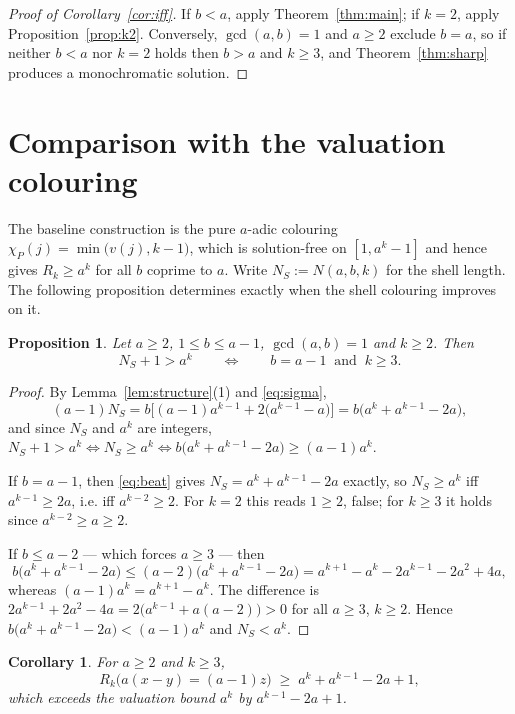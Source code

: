 \documentclass{amsart}
\newtheorem{proposition}[theorem]{Proposition}
\newtheorem{corollary}[theorem]{Corollary}
\theoremstyle{definition}
\newcommand{\Rk}{R_k}
\begin{document}
\begin{proof}[Proof of Corollary~\ref{cor:iff}]
If $b<a$, apply Theorem~\ref{thm:main}; if $k=2$, apply
Proposition~\ref{prop:k2}.  Conversely, $\gcd(a,b)=1$ and $a\ge2$ exclude
$b=a$, so if neither $b<a$ nor $k=2$ holds then $b>a$ and $k\ge3$, and
Theorem~\ref{thm:sharp} produces a monochromatic solution.
\end{proof}

\section{Comparison with the valuation colouring}

The baseline construction is the pure $a$-adic colouring
$\chi_P(j)=\min\bigl(v(j),k-1\bigr)$, which is solution-free on $[1,a^{k}-1]$
and hence gives $\Rk\ge a^{k}$ for all $b$ coprime to $a$.  Write
$N_S:=N(a,b,k)$ for the shell length.  The following proposition determines
exactly when the shell colouring improves on it.

\begin{proposition}\label{prop:beat}
Let $a\ge2$, $1\le b\le a-1$, $\gcd(a,b)=1$ and $k\ge2$.  Then
\[
  N_S+1>a^{k}\qquad\Longleftrightarrow\qquad b=a-1\ \text{ and }\ k\ge3 .
\]
\end{proposition}

\begin{proof}
By Lemma~\ref{lem:structure}(1) and \eqref{eq:sigma},
\begin{equation}\label{eq:beat}
  (a-1)N_S=b\bigl[(a-1)a^{k-1}+2\bigl(a^{k-1}-a\bigr)\bigr]
          =b\bigl(a^{k}+a^{k-1}-2a\bigr),
\end{equation}
and since $N_S$ and $a^k$ are integers,
$N_S+1>a^{k}\iff N_S\ge a^{k}\iff b\bigl(a^{k}+a^{k-1}-2a\bigr)\ge(a-1)a^{k}$.

If $b=a-1$, then \eqref{eq:beat} gives $N_S=a^{k}+a^{k-1}-2a$ exactly, so
$N_S\ge a^{k}$ iff $a^{k-1}\ge2a$, i.e. iff $a^{k-2}\ge2$.  For $k=2$ this
reads $1\ge2$, false; for $k\ge3$ it holds since $a^{k-2}\ge a\ge2$.

If $b\le a-2$ --- which forces $a\ge3$ --- then
\[
  b\bigl(a^{k}+a^{k-1}-2a\bigr)\le(a-2)\bigl(a^{k}+a^{k-1}-2a\bigr)
   =a^{k+1}-a^{k}-2a^{k-1}-2a^{2}+4a,
\]
whereas $(a-1)a^{k}=a^{k+1}-a^{k}$.  The difference is
$2a^{k-1}+2a^{2}-4a=2\bigl(a^{k-1}+a(a-2)\bigr)>0$ for all $a\ge3$, $k\ge2$.
Hence $b\bigl(a^{k}+a^{k-1}-2a\bigr)<(a-1)a^{k}$ and $N_S<a^{k}$.
\end{proof}

\begin{corollary}\label{cor:beat}
For $a\ge2$ and $k\ge3$,
\[
  \Rk\bigl(a(x-y)=(a-1)z\bigr)\;\ge\;a^{k}+a^{k-1}-2a+1 ,
\]
which exceeds the valuation bound $a^{k}$ by $a^{k-1}-2a+1$.
\end{corollary}
\end{document}
